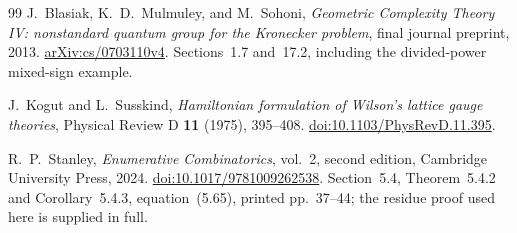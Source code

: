 \begin{thebibliography}{99}
J.~Blasiak, K.~D.~Mulmuley, and M.~Sohoni,
\emph{Geometric Complexity Theory IV: nonstandard quantum group for the
Kronecker problem}, final journal preprint, 2013.
\href{https://arxiv.org/abs/cs/0703110v4}{arXiv:cs/0703110v4}.
Sections~1.7 and~17.2, including the divided-power mixed-sign example.

J.~Kogut and L.~Susskind,
\emph{Hamiltonian formulation of Wilson's lattice gauge theories},
Physical Review D \textbf{11} (1975), 395--408.
\href{https://doi.org/10.1103/PhysRevD.11.395}{doi:10.1103/PhysRevD.11.395}.

R.~P.~Stanley, \emph{Enumerative Combinatorics}, vol.~2, second edition,
Cambridge University Press, 2024.
\href{https://doi.org/10.1017/9781009262538}{doi:10.1017/9781009262538}.
Section~5.4, Theorem~5.4.2 and Corollary~5.4.3, equation~(5.65),
printed pp.~37--44; the residue proof used here is supplied in full.

\end{thebibliography}
